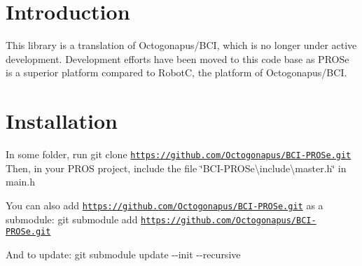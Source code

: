\hypertarget{index_intro_sec}{}\section{Introduction}\label{index_intro_sec}
This library is a translation of Octogonapus/\+B\+CI, which is no longer under active development. Development efforts have been moved to this code base as P\+R\+O\+Se is a superior platform compared to RobotC, the platform of Octogonapus/\+B\+CI.\hypertarget{index_install_sec}{}\section{Installation}\label{index_install_sec}
In some folder, run {\ttfamily git clone \href{https://github.com/Octogonapus/BCI-PROSe.git}{\tt https\+://github.\+com/\+Octogonapus/\+B\+C\+I-\/\+P\+R\+O\+Se.\+git}} Then, in your P\+R\+OS project, include the file \char`\"{}\+B\+C\+I-\/\+P\+R\+O\+Se\textbackslash{}include\textbackslash{}master.\+h\char`\"{} in main.\+h

You can also add \href{https://github.com/Octogonapus/BCI-PROSe.git}{\tt https\+://github.\+com/\+Octogonapus/\+B\+C\+I-\/\+P\+R\+O\+Se.\+git} as a submodule\+: {\ttfamily git submodule add \href{https://github.com/Octogonapus/BCI-PROSe.git}{\tt https\+://github.\+com/\+Octogonapus/\+B\+C\+I-\/\+P\+R\+O\+Se.\+git}}

And to update\+: {\ttfamily git submodule update -\/-\/init -\/-\/recursive} 